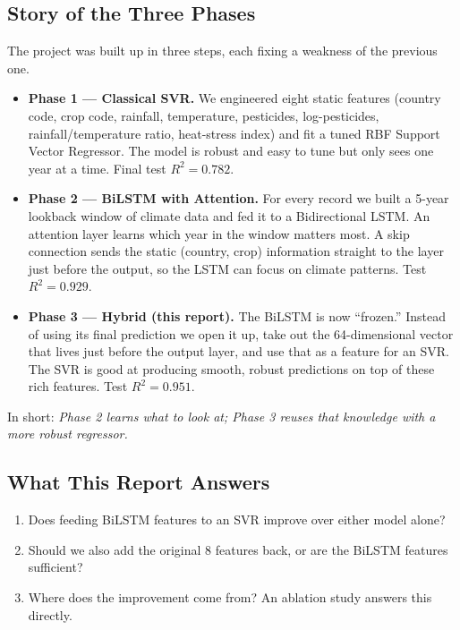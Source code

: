 \documentclass[conference]{IEEEtran}
\begin{document}
\subsection{Story of the Three Phases}
The project was built up in three steps, each fixing a weakness of the previous one.

\begin{itemize}
    \item \textbf{Phase 1 — Classical SVR.} We engineered eight static features (country code, crop code, rainfall, temperature, pesticides, log-pesticides, rainfall/temperature ratio, heat-stress index) and fit a tuned RBF Support Vector Regressor. The model is robust and easy to tune but only sees one year at a time. Final test $R^{2} = 0.782$.
    \item \textbf{Phase 2 — BiLSTM with Attention.} For every record we built a 5-year lookback window of climate data and fed it to a Bidirectional LSTM. An attention layer learns which year in the window matters most. A skip connection sends the static (country, crop) information straight to the layer just before the output, so the LSTM can focus on climate patterns. Test $R^{2} = 0.929$.
    \item \textbf{Phase 3 — Hybrid (this report).} The BiLSTM is now ``frozen.'' Instead of using its final prediction we open it up, take out the 64-dimensional vector that lives just before the output layer, and use that as a feature for an SVR. The SVR is good at producing smooth, robust predictions on top of these rich features. Test $R^{2} = 0.951$.
\end{itemize}

In short: \emph{Phase 2 learns what to look at; Phase 3 reuses that knowledge with a more robust regressor.}

\subsection{What This Report Answers}
\begin{enumerate}
    \item Does feeding BiLSTM features to an SVR improve over either model alone?
    \item Should we also add the original 8 features back, or are the BiLSTM features sufficient?
    \item Where does the improvement come from? An ablation study answers this directly.
\end{enumerate}

\end{document}
